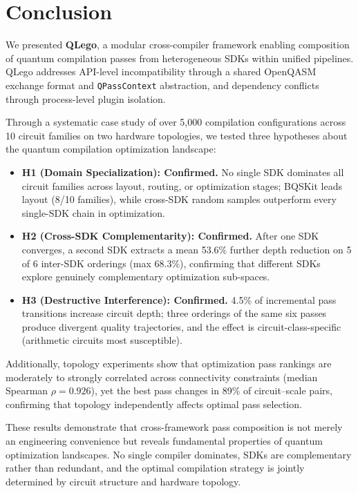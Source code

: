 \documentclass[conference]{IEEEtran}
\begin{document}
\section{Conclusion}
\label{sec:conclusion}

We presented \textbf{QLego}, a modular cross-compiler framework enabling composition of quantum compilation passes from heterogeneous SDKs within unified pipelines.
QLego addresses API-level incompatibility through a shared OpenQASM exchange format and \texttt{QPassContext} abstraction, and dependency conflicts through process-level plugin isolation.

Through a systematic case study of over 5,000 compilation configurations across 10 circuit families on two hardware topologies, we tested three hypotheses about the quantum compilation optimization landscape:

\begin{itemize}[nosep]
    \item \textbf{H1 (Domain Specialization): Confirmed.} No single SDK dominates all circuit families across layout, routing, or optimization stages; BQSKit leads layout (8/10 families), while cross-SDK random samples outperform every single-SDK chain in optimization.
    \item \textbf{H2 (Cross-SDK Complementarity): Confirmed.} After one SDK converges, a second SDK extracts a mean 53.6\% further depth reduction on 5 of 6 inter-SDK orderings (max 68.3\%), confirming that different SDKs explore genuinely complementary optimization sub-spaces.
    \item \textbf{H3 (Destructive Interference): Confirmed.} 4.5\% of incremental pass transitions increase circuit depth; three orderings of the same six passes produce divergent quality trajectories, and the effect is circuit-class-specific (arithmetic circuits most susceptible).
\end{itemize}

Additionally, topology experiments show that optimization pass rankings are moderately to strongly correlated across connectivity constraints (median Spearman $\rho = 0.926$), yet the best pass changes in 89\% of circuit--scale pairs, confirming that topology independently affects optimal pass selection.

These results demonstrate that cross-framework pass composition is not merely an engineering convenience but reveals fundamental properties of quantum optimization landscapes.
No single compiler dominates, SDKs are complementary rather than redundant, and the optimal compilation strategy is jointly determined by circuit structure and hardware topology.
\end{document}

